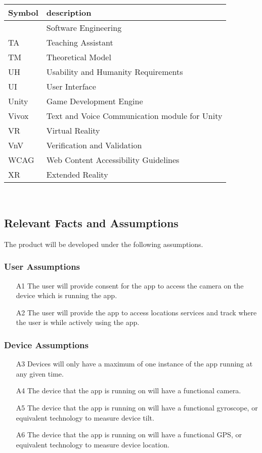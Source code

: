 \documentclass[12pt]{article}
\begin{document}
\renewcommand{\arraystretch}{1.2}
\begin{tabular}{l l} 
  \toprule		
  \textbf{Symbol} & \textbf{description}\\
  \midrule 
  \progname{} & Software Engineering\\
  TA & Teaching Assistant\\
  TM & Theoretical Model\\
  UH & Usability and Humanity Requirements\\
  UI & User Interface\\
  Unity & Game Development Engine\\
  Vivox & Text and Voice Communication module for Unity\\
  VR & Virtual Reality\\
  VnV & Verification and Validation \\
  WCAG & Web Content Accessibility Guidelines \\
  XR & Extended Reality\\
  \bottomrule
\end{tabular}\\

\subsection{Relevant Facts and Assumptions}
The product will be developed under the following assumptions.

\subsubsection{User Assumptions}
\begin{itemize}
    \item [A1] The user will provide consent for the app to access the camera on the device which is running the app. 
    \item [A2] The user will provide the app to access locations services and track where the user is while actively using the app. 
\end{itemize}

\subsubsection{Device Assumptions}
\begin{itemize}
    \item [A3] Devices will only have a maximum of one instance of the app running at any given time. 
    \item [A4] The device that the app is running on will have a functional camera. 
    \item [A5] The device that the app is running on will have a functional gyroscope, or equivalent technology to measure device tilt. 
    \item [A6] The device that the app is running on will have a functional GPS, or equivalent technology to measure device location. 
\end{itemize}
\end{document}
